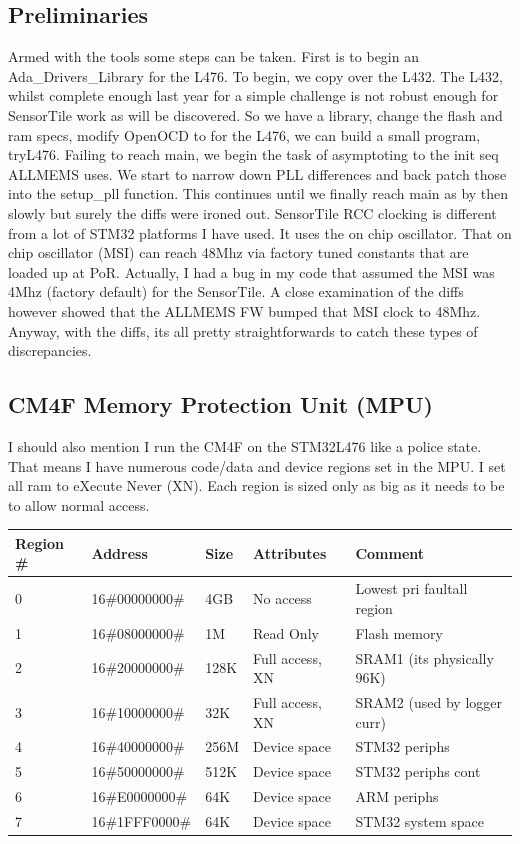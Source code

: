\documentclass[11pt]{article}
\numberwithin{figure}{section}
\begin{document}
\subsection{Preliminaries}
Armed with the tools some steps can be taken. First is to begin an
Ada\_Drivers\_Library for the L476. To begin, we copy over the
L432. The L432, whilst complete enough last year for a simple
challenge is not robust enough for SensorTile work as will be
discovered. So we have a library, change the flash and ram specs,
modify OpenOCD to for the L476, we can build a small
program, tryL476. Failing to reach main, we begin the task of
asymptoting to the init seq ALLMEMS uses. We start to narrow down PLL
differences and back patch those into the setup\_pll function. This
continues until we finally reach main as by then slowly but surely the
diffs were ironed out. SensorTile RCC clocking is different from a lot
of STM32 platforms I have used. It uses the on chip oscillator. That
on chip oscillator (MSI) can reach 48Mhz via factory tuned constants that
are loaded up at PoR. Actually, I had a bug in my code that assumed
the MSI was 4Mhz (factory default) for the SensorTile. A close
examination of the diffs however showed that the ALLMEMS FW bumped
that MSI clock to 48Mhz. Anyway, with the diffs, its all pretty
straightforwards to catch these types of discrepancies.
\subsection{CM4F Memory Protection Unit (MPU)}
I should also mention I run the CM4F on the STM32L476 like a police state. That
means I have numerous code/data and device regions set in the MPU. I set all ram to
eXecute Never (XN). Each region is sized only as big as it needs to be
to allow normal access.
\begin{table}[h]
\begin{tabular}{|l|l|l|l|l|}
\hline
Region \# & Address & Size & Attributes & Comment\\ \hline
0 & 16\#00000000\# & 4GB & No access & Lowest pri faultall region\\ \hline
1 & 16\#08000000\# & 1M & Read Only & Flash memory\\ \hline
2 & 16\#20000000\# & 128K & Full access, XN & SRAM1 (its physically 96K)\\ \hline
3 & 16\#10000000\# & 32K & Full access, XN & SRAM2 (used by logger curr)\\ \hline
4 & 16\#40000000\# & 256M & Device space & STM32 periphs\\ \hline
5 & 16\#50000000\# & 512K & Device space & STM32 periphs cont\\ \hline
6 & 16\#E0000000\# & 64K & Device space & ARM periphs\\ \hline
7 & 16\#1FFF0000\# & 64K & Device space & STM32 system space\\ \hline
\end{tabular}
\end{table}
\end{document}

